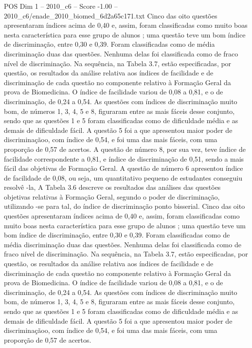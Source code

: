 \begin{textsample}{POS Dim 1 – 2010\_c6 – Score -1.00 – 2010\_c6/enade\_2010\_biomed\_6d2a65c171.txt}
Cinco das oito questões apresentaram índices acima de 0,40 e, assim, foram classificadas como muito boas nesta característica para esse grupo de alunos ; uma questão teve um bom índice de discriminação, entre 0,30 e 0,39.
Foram classificadas como de média discriminação duas das questões.
Nenhuma delas foi classificada como de fraco nível de discriminação.
Na sequência, na Tabela 3.7, estão especificadas, por questão, os resultados da análise relativa aos índices de facilidade e de discriminação de cada questão no componente relativo à Formação Geral da prova de Biomedicina.
O índice de facilidade variou de 0,08 a 0,81, e o de discriminação, de 0,24 a 0,54.
As questões com índices de discriminação muito bom, de números 1, 3, 4, 5 e 8, figuraram entre as mais fáceis desse conjunto, sendo que as questões 1 e 5 foram classificadas como de dificuldade média e as demais de dificuldade fácil.
A questão 5 foi a que apresentou maior poder de discriminaçãoo, com índice de 0,54, e foi uma das mais fáceis, com uma proporção de 0,57 de acertos.
A questão de número 8, por sua vez, teve índice de facilidade correspondente a 0,81, e índice de discriminação de 0,51, sendo a mais fácil das objetivas de Formação Geral.
A questão de número 6 apresentou índice de facilidade de 0,08, ou seja, um quantitativo pequeno de estudantes conseguiu resolvê -la, A Tabela 3.6 descreve os resultados das análises das questões objetivas relativas à Formação Geral, segundo o poder de discriminação, utilizando -se para tal, do índice de discriminação ponto bisserial.
Cinco das oito questões apresentaram índices acima de 0,40 e, assim, foram classificadas como muito boas nesta característica para esse grupo de alunos ; uma questão teve um bom índice de discriminação, entre 0,30 e 0,39.
Foram classificadas como de média discriminação duas das questões.
Nenhuma delas foi classificada como de fraco nível de discriminação.
Na sequência, na Tabela 3.7, estão especificadas, por questão, os resultados da análise relativa aos índices de facilidade e de discriminação de cada questão no componente relativo à Formação Geral da prova de Biomedicina.
O índice de facilidade variou de 0,08 a 0,81, e o de discriminação, de 0,24 a 0,54.
As questões com índices de discriminação muito bom, de números 1, 3, 4, 5 e 8, figuraram entre as mais fáceis desse conjunto, sendo que as questões 1 e 5 foram classificadas como de dificuldade média e as demais de dificuldade fácil.
A questão 5 foi a que apresentou maior poder de discriminaçãoo, com índice de 0,54, e foi uma das mais fáceis, com uma proporção de 0,57 de acertos.

\end{textsample}
